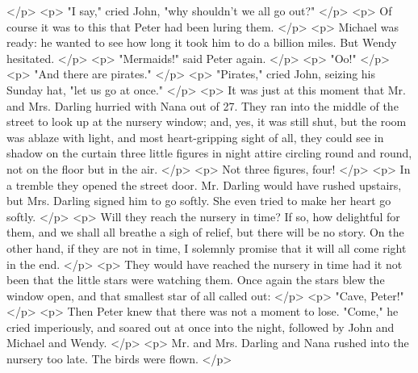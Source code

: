     </p>
    <p>
      "I say," cried John, "why shouldn't we all go out?"
    </p>
    <p>
      Of course it was to this that Peter had been luring them.
    </p>
    <p>
      Michael was ready: he wanted to see how long it took him to do a billion
      miles. But Wendy hesitated.
    </p>
    <p>
      "Mermaids!" said Peter again.
    </p>
    <p>
      "Oo!"
    </p>
    <p>
      "And there are pirates."
    </p>
    <p>
      "Pirates," cried John, seizing his Sunday hat, "let us go at once."
    </p>
    <p>
      It was just at this moment that Mr. and Mrs. Darling hurried with Nana out
      of 27. They ran into the middle of the street to look up at the nursery
      window; and, yes, it was still shut, but the room was ablaze with light,
      and most heart-gripping sight of all, they could see in shadow on the
      curtain three little figures in night attire circling round and round, not
      on the floor but in the air.
    </p>
    <p>
      Not three figures, four!
    </p>
    <p>
      In a tremble they opened the street door. Mr. Darling would have rushed
      upstairs, but Mrs. Darling signed him to go softly. She even tried to make
      her heart go softly.
    </p>
    <p>
      Will they reach the nursery in time? If so, how delightful for them, and
      we shall all breathe a sigh of relief, but there will be no story. On the
      other hand, if they are not in time, I solemnly promise that it will all
      come right in the end.
    </p>
    <p>
      They would have reached the nursery in time had it not been that the
      little stars were watching them. Once again the stars blew the window
      open, and that smallest star of all called out:
    </p>
    <p>
      "Cave, Peter!"
    </p>
    <p>
      Then Peter knew that there was not a moment to lose. "Come," he cried
      imperiously, and soared out at once into the night, followed by John and
      Michael and Wendy.
    </p>
    <p>
      Mr. and Mrs. Darling and Nana rushed into the nursery too late. The birds
      were flown.
    </p>
